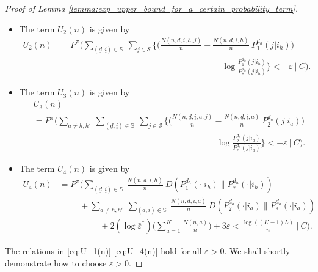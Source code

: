 \begin{proof}[Proof of Lemma \ref{lemma:exp_upper_bound_for_a_certain_probability_term}]
\begin{itemize}
	\item The term $U_2(n)$ is given by
	\begin{align}
		U_2(n)&=P^\pi\bigg(\sum\limits_{(\underline{d}, \underline{i})\in \mathbb{S}}~\sum\limits_{j\in \mathcal{S}}\bigg\lbrace\bigg(\frac{N(n, \underline{d}, \underline{i}, h, j)}{n}-\frac{N(n, \underline{d}, \underline{i}, h)}{n}~P_1^{d_h}(j|i_h)\bigg)\nonumber\\
		&\hspace{8cm}\log \frac{P_1^{d_h}(j|i_h)}{P_*^{d_h}(j|i_h)}\bigg\rbrace < -\varepsilon ~\bigg|~C\bigg).
		\label{eq:U_2(n)}
	\end{align}
	
	\item The term $U_3(n)$ is given by
	\begin{align}
		&U_3(n)\nonumber\\
		&=P^\pi\bigg(\sum\limits_{a\neq h, h'}~\sum\limits_{(\underline{d}, \underline{i})\in \mathbb{S}}~\sum\limits_{j\in \mathcal{S}}\bigg\lbrace\bigg(\frac{N(n, \underline{d}, \underline{i}, a, j)}{n}-\frac{N(n, \underline{d}, \underline{i}, a)}{n}~P_2^{d_a}(j|i_a)\bigg)\nonumber\\
		&\hspace{9cm}\log \frac{P_2^{d_a}(j|i_a)}{P_*^{d_a}(j|i_a)}\bigg\rbrace < -\varepsilon  ~\bigg|~C\bigg).
		\label{eq:U_3(n)}
	\end{align}
	
	\item The term $U_4(n)$ is given by
	\begin{align}
		U_4(n)&=P^\pi\bigg(\sum\limits_{(\underline{d}, \underline{i})\in \mathbb{S}}~\frac{N(n, \underline{d}, \underline{i}, h)}{n}~D(P_1^{d_h}(\cdot|i_h)\|P_*^{d_h}(\cdot|i_h))\nonumber\\
		&\hspace{1cm} +\sum\limits_{a\neq h, h'}~\sum\limits_{(\underline{d}, \underline{i})\in \mathbb{S}}~\frac{N(n, \underline{d}, \underline{i}, a)}{n}~D(P_2^{d_a}(\cdot|i_a)\|P_*^{d_a}(\cdot|i_a)) \nonumber\\
		&\hspace{2cm} + 2(\log \bar{\varepsilon}^*)\bigg(\sum\limits_{a=1}^{K}\frac{N(n, a)}{n}\bigg) + 3\varepsilon  < \frac{\log ((K-1)L)}{n}  ~\bigg|~C\bigg).
		\label{eq:U_4(n)}
	\end{align}
\end{itemize}
The relations in \eqref{eq:U_1(n)}-\eqref{eq:U_4(n)} hold for all $\varepsilon>0$. We shall shortly demonstrate how to choose $\varepsilon>0$.


\end{proof}
